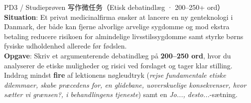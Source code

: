 \begin{emailbox}{PD3 / Studieprøven 写作微任务（Etisk debatindlæg · 200--250+ ord）}
\textbf{Situation}: Et privat medicinalfirma ønsker at lancere en ny genteknologi i Danmark, der både kan fjerne alvorlige arvelige sygdomme og mod ekstra betaling reducere risikoen for almindelige livsstilssygdomme samt styrke børns fysiske udholdenhed allerede før fødslen.\\[3pt]
\textbf{Opgave}: Skriv et argumenterende debatindlæg på \textbf{200--250 ord}, hvor du analyserer de etiske muligheder og risici ved forslaget og tager klar stilling. Inddrag mindst \textbf{fire} af lektionens nøgleudtryk (\textit{rejse fundamentale etiske dilemmaer, skabe præcedens for, en glidebane, uoverskuelige konsekvenser, hvor sætter vi grænsen?, i behandlingens tjeneste}) samt en \textit{Jo..., desto...}-sætning.
\end{emailbox}

